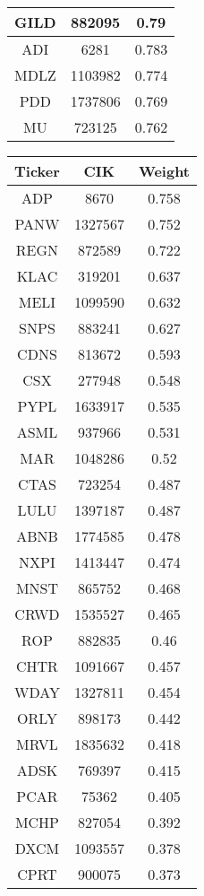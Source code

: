 \documentclass[logo,bsc,singlespacing,parskip]{infthesis}
\begin{document}
\begin{longtable}
\begin{tabular}[t]{|c|c|c|}
GILD & 882095 & 0.79 \\ \hline
ADI & 6281 & 0.783 \\ \hline
MDLZ & 1103982 & 0.774 \\ \hline
PDD & 1737806 & 0.769 \\ \hline
MU & 723125 & 0.762 \\ \hline 
                \end{tabular}
                \hfill
                \begin{tabular}[t]{|c|c|c|}
                    \hline
                    \textbf{Ticker} & \textbf{CIK} & \textbf{Weight} \\ \hline
ADP & 8670 & 0.758 \\ \hline
PANW & 1327567 & 0.752 \\ \hline
REGN & 872589 & 0.722 \\ \hline
KLAC & 319201 & 0.637 \\ \hline
MELI & 1099590 & 0.632 \\ \hline
SNPS & 883241 & 0.627 \\ \hline
CDNS & 813672 & 0.593 \\ \hline
CSX & 277948 & 0.548 \\ \hline
PYPL & 1633917 & 0.535 \\ \hline
ASML & 937966 & 0.531 \\ \hline
MAR & 1048286 & 0.52 \\ \hline
CTAS & 723254 & 0.487 \\ \hline
LULU & 1397187 & 0.487 \\ \hline
ABNB & 1774585 & 0.478 \\ \hline
NXPI & 1413447 & 0.474 \\ \hline
MNST & 865752 & 0.468 \\ \hline
CRWD & 1535527 & 0.465 \\ \hline
ROP & 882835 & 0.46 \\ \hline
CHTR & 1091667 & 0.457 \\ \hline
WDAY & 1327811 & 0.454 \\ \hline
ORLY & 898173 & 0.442 \\ \hline
MRVL & 1835632 & 0.418 \\ \hline
ADSK & 769397 & 0.415 \\ \hline
PCAR & 75362 & 0.405 \\ \hline
MCHP & 827054 & 0.392 \\ \hline
DXCM & 1093557 & 0.378 \\ \hline
CPRT & 900075 & 0.373 \\ \hline

\end{tabular}
\end{longtable}
\end{document}

